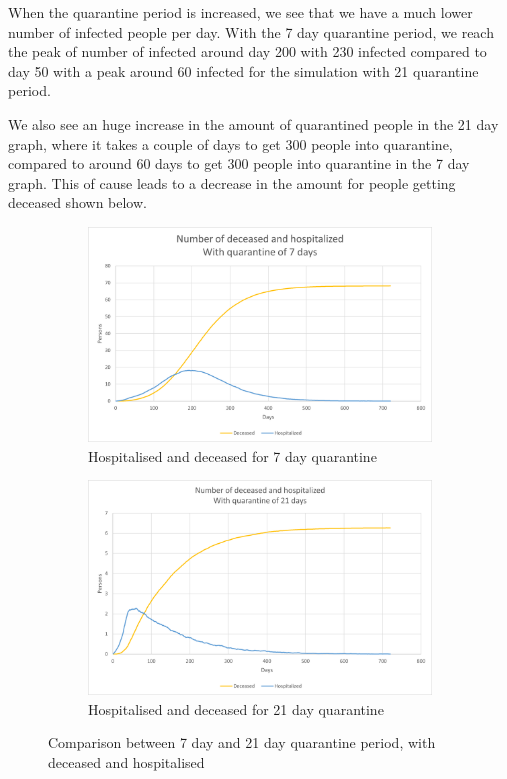 When the quarantine period is increased, we see that we have a much lower number of infected people per day. With the 7 day quarantine period, we reach the peak of number of infected around day 200 with 230 infected compared to day 50 with a peak around 60 infected for the simulation with 21 quarantine period.

We also see an huge increase in the amount of quarantined people in the 21 day graph, where it takes a couple of days to get 300 people into quarantine, compared to around 60 days to get 300 people into quarantine in the 7 day graph. This of cause leads to a decrease in the amount for people getting deceased shown below.


\begin{figure}[H]
\centering
\begin{subfigure}{.5\textwidth}
  \centering
  \includegraphics[width=.95\linewidth]{0_billeder/CT_HOS_7.png}
  \caption{Hospitalised and deceased for 7 day quarantine}
  \label{fig:CT_HOS_7}
\end{subfigure}%
\begin{subfigure}{.5\textwidth}
  \centering
  \includegraphics[width=.95\linewidth]{0_billeder/CT_HOS_21.png}
  \caption{Hospitalised and deceased for 21 day quarantine}
  \label{fig:CT_HOS_21}
\end{subfigure}
\caption{Comparison between 7 day and 21 day quarantine period, with deceased and hospitalised}
\label{fig:test}
\end{figure}

